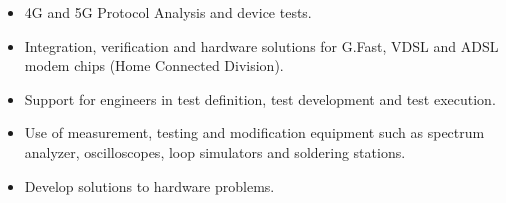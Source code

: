 \documentclass[10pt,a4paper,ragged2e]{altacv}
\begin{document}
\tagline{}

\begin{fullwidth}
\makecvheader
\end{fullwidth}



\begin{itemize}
\item 4G and 5G Protocol Analysis and device tests.
\end{itemize}

\divider

\begin{itemize}
\item Integration, verification and hardware solutions for G.Fast, VDSL and ADSL modem chips (Home Connected Division).
\item Support for engineers in test definition, test development and test execution.
\item Use of measurement, testing and modification equipment such as spectrum analyzer, oscilloscopes, loop simulators and soldering stations.
\item Develop solutions to hardware problems.
\end{itemize}

\end{document}
